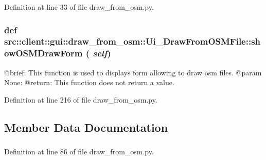 Definition at line 33 of file draw\_\-from\_\-osm.py.

\hypertarget{classsrc_1_1client_1_1gui_1_1draw__from__osm_1_1Ui__DrawFromOSMFile_a69047d7b22ed10011b036e47859088a2}{
\subsubsection[{showOSMDrawForm}]{\setlength{\rightskip}{0pt plus 5cm}def src::client::gui::draw\_\-from\_\-osm::Ui\_\-DrawFromOSMFile::showOSMDrawForm ( {\em self})}}
\label{classsrc_1_1client_1_1gui_1_1draw__from__osm_1_1Ui__DrawFromOSMFile_a69047d7b22ed10011b036e47859088a2}
\begin{DoxyVerb}
@brief: This function is used to displays form allowing to draw osm files.
@param None:
@return: This function does not return a value.
\end{DoxyVerb}
 

Definition at line 216 of file draw\_\-from\_\-osm.py.



\subsection{Member Data Documentation}
\hypertarget{classsrc_1_1client_1_1gui_1_1draw__from__osm_1_1Ui__DrawFromOSMFile_a87b5abfbdc3265d7863395957a70c14f}{
\subsubsection[{cancel\_\-window}]{}}
\label{classsrc_1_1client_1_1gui_1_1draw__from__osm_1_1Ui__DrawFromOSMFile_a87b5abfbdc3265d7863395957a70c14f}


Definition at line 86 of file draw\_\-from\_\-osm.py.

